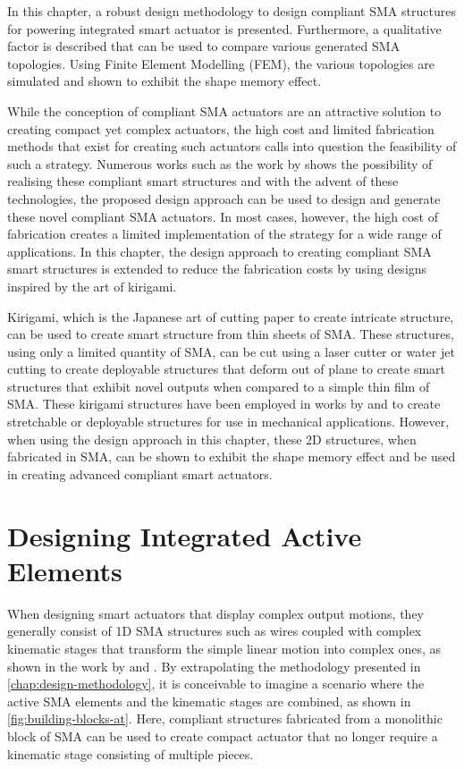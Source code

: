 In this chapter, a robust design methodology to design compliant SMA structures for powering integrated smart actuator is presented. Furthermore, a qualitative factor is described that can be used to compare various generated SMA topologies. Using Finite Element Modelling (FEM), the various topologies are simulated and shown to exhibit the shape memory effect.

While the conception of compliant SMA actuators are an attractive solution to creating compact yet complex actuators, the high cost and limited fabrication methods that exist for creating such actuators calls into question the feasibility of such a strategy. Numerous works such as the work by \cite{elahiniaAdditiveManufacturingNiTiHf2018} shows the possibility of realising these compliant smart structures and with the advent of these technologies, the proposed design approach can be used to design and generate these novel compliant SMA actuators. In most cases, however, the high cost of fabrication creates a limited implementation of the strategy for a wide range of applications. In this chapter, the design approach to creating compliant SMA smart structures is extended to reduce the fabrication costs by using designs inspired by the art of kirigami.

Kirigami, which is the Japanese art of cutting paper to create intricate structure, can be used to create smart structure from thin sheets of SMA. These structures, using only a limited quantity of SMA, can be cut using a laser cutter or water jet cutting to create deployable structures that deform out of plane to create smart structures that exhibit novel outputs when compared to a simple thin film of SMA. These kirigami structures have been employed in works by \cite{tangProgrammableKiriKirigamiMetamaterials2017} and \cite{shyuKirigamiApproachEngineering2015} to create stretchable or deployable structures for use in mechanical applications. However, when using the design approach in this chapter, these 2D structures, when fabricated in SMA, can be shown to exhibit the shape memory effect and be used in creating advanced compliant smart actuators.

\section{Designing Integrated Active Elements}
When designing smart actuators that display complex output motions, they generally consist of 1D SMA structures such as wires coupled with complex kinematic stages that transform the simple linear motion into complex ones, as shown in the work by \cite{modabberifarShapeMemoryAlloyactuated2018} and \cite{maffiodoThreeFingeredGripperFlexure2017}. By extrapolating the methodology presented in \cref{chap:design-methodology}, it is conceivable to imagine a scenario where the active SMA elements and the kinematic stages are combined, as shown in \cref{fig:building-blocks-at}. Here, compliant structures fabricated from a monolithic block of SMA can be used to create compact actuator that no longer require a kinematic stage consisting of multiple pieces.

